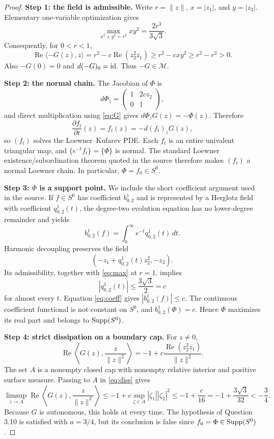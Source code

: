 \documentclass[11pt]{article}
\newcommand{\id}{\mathop{\rm id}}
\newcommand{\Supp}{\mathop{\rm Supp}}
\begin{document}
\begin{proof}
\textbf{Step 1: the field is admissible.}
Write $r=\|z\|$, $x=|z_1|$, and $y=|z_2|$.  Elementary one-variable
optimization gives
\begin{equation}\label{eq:max}
 \max_{x^2+y^2=r^2}xy^2=\frac{2r^3}{3\sqrt3}.
\end{equation}
Consequently, for $0<r<1$,
\[
 \operatorname{Re}\langle-G(z),z\rangle
 =r^2-c\operatorname{Re}(z_2^2\overline{z_1})
 \ge r^2-cxy^2\ge r^2-r^3>0.
\]
Also $-G(0)=0$ and $d(-G)_0=\id$.  Thus $-G\in\mathcal M$.

\textbf{Step 2: the normal chain.}
The Jacobian of $\Phi$ is
\[
 d\Phi_z=\begin{pmatrix}1&2cz_2\\0&1\end{pmatrix},
\]
and direct multiplication using \eqref{eq:G} gives
$d\Phi_zG(z)=-\Phi(z)$.  Therefore
\[
 \frac{\partial f_t}{\partial t}(z)=f_t(z)=-d(f_t)_zG(z),
\]
so $(f_t)$ solves the Loewner--Kufarev PDE.  Each $f_t$ is an entire
univalent triangular map, and $\{e^{-t}f_t\}=\{\Phi\}$ is normal.
The standard Loewner existence/subordination theorem quoted in the source
therefore makes $(f_t)$ a normal Loewner chain.  In particular,
$\Phi=f_0\in S^0$.

\textbf{Step 3: $\Phi$ is a support point.}
We include the short coefficient argument used in the source.  If
$f\in S^0$ has coefficient $b^1_{0,2}$ and is represented by a Herglotz
field with coefficient $q^1_{0,2}(t)$, the degree-two evolution equation has
no lower-degree remainder and yields
\begin{equation}\label{eq:coeff}
 b^1_{0,2}(f)=\int_0^\infty e^{-t}q^1_{0,2}(t)\,dt.
\end{equation}
Harmonic decoupling preserves the field
\[
 (-z_1+q^1_{0,2}(t)z_2^2,-z_2).
\]
Its admissibility, together with \eqref{eq:max} at $r=1$, implies
\[
 |q^1_{0,2}(t)|\le\frac{3\sqrt3}{2}=c
\]
for almost every $t$.  Equation \eqref{eq:coeff} gives
$|b^1_{0,2}(f)|\le c$.  The continuous coefficient functional is not
constant on $S^0$, and $b^1_{0,2}(\Phi)=c$.  Hence $\Phi$ maximizes its
real part and belongs to $\Supp(S^0)$.

\textbf{Step 4: strict dissipation on a boundary cap.}
For $z\ne0$,
\begin{equation}\label{eq:diss}
 \operatorname{Re}\left\langle G(z),\frac{z}{\|z\|^2}\right\rangle
 =-1+c\frac{\operatorname{Re}(z_2^2\overline{z_1})}{\|z\|^2}.
\end{equation}
The set $A$ is a nonempty closed cap with nonempty relative interior and
positive surface measure.  Passing to $A$ in \eqref{eq:diss} gives
\[
 \limsup_{z\to A}\operatorname{Re}\left\langle
 G(z),\frac{z}{\|z\|^2}\right\rangle
 \le -1+c\sup_{\zeta\in A}|\zeta_1||\zeta_2|^2
 \le -1+\frac{c}{16}
 =-1+\frac{3\sqrt3}{32}< -\frac34.
\]
Because $G$ is autonomous, this holds at every time.  The hypothesis of
Question 3.10 is satisfied with $a=3/4$, but its conclusion is false since
$f_0=\Phi\in\Supp(S^0)$.
\end{proof}
\end{document}

